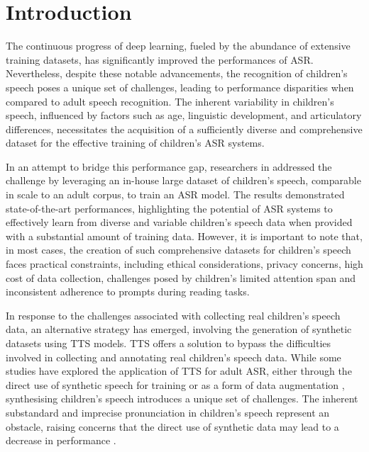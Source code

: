 \label{chap:6}
\cleardoublepage

\section{Introduction}

The continuous progress of deep learning, fueled by the abundance of extensive training datasets, has significantly improved the performances of \ac{ASR}. Nevertheless, despite these notable advancements, the recognition of children's speech poses a unique set of challenges, leading to performance disparities when compared to adult speech recognition. The inherent variability in children's speech, influenced by factors such as age, linguistic development, and articulatory differences, necessitates the acquisition of a sufficiently diverse and comprehensive dataset for the effective training of children's \ac{ASR} systems.


In an attempt to bridge this performance gap, researchers in \cite{asr-google} addressed the challenge by leveraging an in-house large dataset of children's speech, comparable in scale to an adult corpus, to train an \ac{ASR} model. The results demonstrated state-of-the-art performances, highlighting the potential of \ac{ASR} systems to effectively learn from diverse and variable children's speech data when provided with a substantial amount of training data. However, it is important to note that, in most cases, the creation of such comprehensive datasets for children's speech faces practical constraints, including ethical considerations, privacy concerns, high cost of data collection, challenges posed by children's limited attention span and inconsistent adherence to prompts during reading tasks.


In response to the challenges associated with collecting real children's speech data, an alternative strategy has emerged, involving the generation of synthetic datasets using \ac{TTS} models. \ac{TTS} offers a solution to bypass the difficulties involved in collecting and annotating real children's speech data. While some studies have explored the application of \ac{TTS} for adult \ac{ASR}, either through the direct use of synthetic speech for training or as a form of data augmentation \cite{laptev2020you, fazel21_interspeech}, synthesising children's speech introduces a unique set of challenges. The inherent substandard and imprecise pronunciation in children's speech \cite{wang2021towards} represent an obstacle, raising concerns that the direct use of synthetic data may lead to a decrease in performance \cite{wang2021towards, hu2022synt++}.

